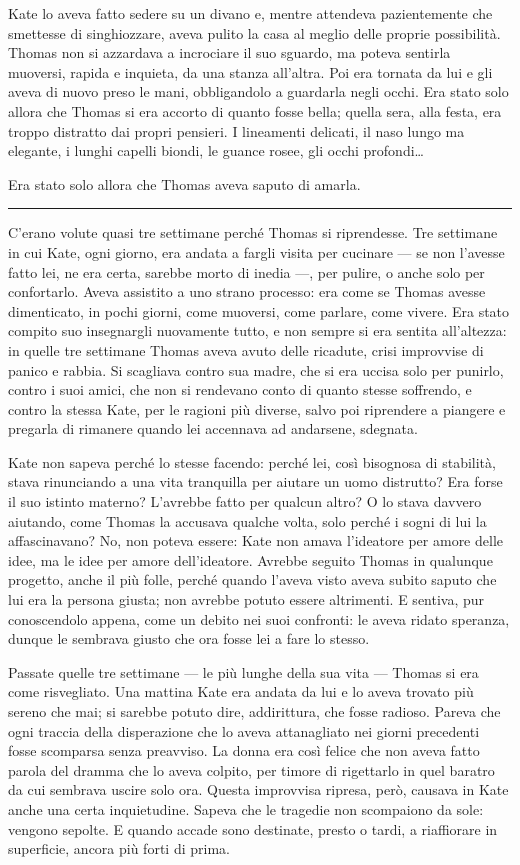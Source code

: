 \documentclass[a4paper,oneside,11pt]{memoir}
\begin{document}
Kate lo aveva fatto sedere su un divano e, mentre attendeva pazientemente che
smettesse di singhiozzare, aveva pulito la casa al meglio delle proprie
possibilità. Thomas non si azzardava a incrociare il suo sguardo, ma poteva
sentirla muoversi, rapida e inquieta, da una stanza all'altra. Poi era tornata
da lui e gli aveva di nuovo preso le mani, obbligandolo a guardarla negli occhi.
Era stato solo allora che Thomas si era accorto di quanto fosse bella; quella
sera, alla festa, era troppo distratto dai propri pensieri. I lineamenti
delicati, il naso lungo ma elegante, i lunghi capelli biondi, le guance rosee,
gli occhi profondi\dots{}

Era stato solo allora che Thomas aveva saputo di amarla.

\plainbreak{1}

C'erano volute quasi tre settimane perché Thomas si riprendesse. Tre settimane
in cui Kate, ogni giorno, era andata a fargli visita per cucinare --- se non
l'avesse fatto lei, ne era certa, sarebbe morto di inedia ---, per pulire, o
anche solo per confortarlo. Aveva assistito a uno strano processo: era come se
Thomas avesse dimenticato, in pochi giorni, come muoversi, come parlare, come
vivere. Era stato compito suo insegnargli nuovamente tutto, e non sempre si era
sentita all'altezza: in quelle tre settimane Thomas aveva avuto delle ricadute,
crisi improvvise di panico e rabbia. Si scagliava contro sua madre, che si era
uccisa solo per punirlo, contro i suoi amici, che non si rendevano conto di
quanto stesse soffrendo, e contro la stessa Kate, per le ragioni più diverse,
salvo poi riprendere a piangere e pregarla di rimanere quando lei accennava ad
andarsene, sdegnata.

Kate non sapeva perché lo stesse facendo: perché lei, così bisognosa di
stabilità, stava rinunciando a una vita tranquilla per aiutare un uomo
distrutto? Era forse il suo istinto materno? L'avrebbe fatto per qualcun altro?
O lo stava davvero aiutando, come Thomas la accusava qualche volta, solo perché
i sogni di lui la affascinavano? No, non poteva essere: Kate non amava
l'ideatore per amore delle idee, ma le idee per amore dell'ideatore. Avrebbe
seguito Thomas in qualunque progetto, anche il più folle, perché quando l'aveva
visto aveva subito saputo che lui era la persona giusta; non avrebbe potuto
essere altrimenti. E sentiva, pur conoscendolo appena, come un debito nei suoi
confronti: le aveva ridato speranza, dunque le sembrava giusto che ora fosse lei
a fare lo stesso.

Passate quelle tre settimane --- le più lunghe della sua vita --- Thomas si era
come risvegliato. Una mattina Kate era andata da lui e lo aveva trovato più
sereno che mai; si sarebbe potuto dire, addirittura, che fosse radioso. Pareva
che ogni traccia della disperazione che lo aveva attanagliato nei giorni
precedenti fosse scomparsa senza preavviso. La donna era così felice che non
aveva fatto parola del dramma che lo aveva colpito, per timore di rigettarlo in
quel baratro da cui sembrava uscire solo ora. Questa improvvisa ripresa, però,
causava in Kate anche una certa inquietudine. Sapeva che le tragedie non
scompaiono da sole: vengono sepolte. E quando accade sono destinate, presto o
tardi, a riaffiorare in superficie, ancora più forti di prima.
\end{document}
